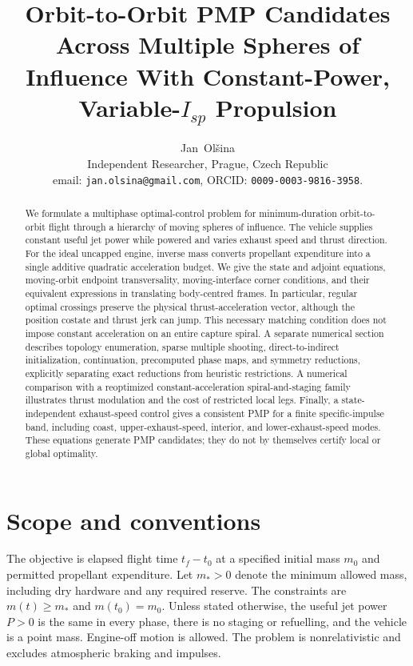 \documentclass[journal, a4paper]{IEEEtran}
\begin{document}
\title{Orbit-to-Orbit PMP Candidates Across Multiple Spheres of Influence With Constant-Power, Variable-$I_{\!sp}$ Propulsion}
\author{Jan~Ol\v{s}ina\\[1ex] Independent Researcher, Prague, Czech Republic\\
email: \texttt{jan.olsina@gmail.com}, ORCID: \texttt{0009-0003-9816-3958}.}
\maketitle
\begin{abstract}
We formulate a multiphase optimal-control problem for minimum-duration orbit-to-orbit flight through a hierarchy of moving spheres of influence. The vehicle supplies constant useful jet power while powered and varies exhaust speed and thrust direction. For the ideal uncapped engine, inverse mass converts propellant expenditure into a single additive quadratic acceleration budget. We give the state and adjoint equations, moving-orbit endpoint transversality, moving-interface corner conditions, and their equivalent expressions in translating body-centred frames. In particular, regular optimal crossings preserve the physical thrust-acceleration vector, although the position costate and thrust jerk can jump. This necessary matching condition does not impose constant acceleration on an entire capture spiral. A separate numerical section describes topology enumeration, sparse multiple shooting, direct-to-indirect initialization, continuation, precomputed phase maps, and symmetry reductions, explicitly separating exact reductions from heuristic restrictions. A numerical comparison with a reoptimized constant-acceleration spiral-and-staging family illustrates thrust modulation and the cost of restricted local legs. Finally, a state-independent exhaust-speed control gives a consistent PMP for a finite specific-impulse band, including coast, upper-exhaust-speed, interior, and lower-exhaust-speed modes. These equations generate PMP candidates; they do not by themselves certify local or global optimality.
\end{abstract}

\section{Scope and conventions}
The objective is elapsed flight time $t_f-t_0$ at a specified initial mass $m_0$ and permitted propellant expenditure. Let $m_*>0$ denote the minimum allowed mass, including dry hardware and any required reserve. The constraints are $m(t)\ge m_*$ and $m(t_0)=m_0$. Unless stated otherwise, the useful jet power $P>0$ is the same in every phase, there is no staging or refuelling, and the vehicle is a point mass. Engine-off motion is allowed. The problem is nonrelativistic and excludes atmospheric braking and impulses.
\end{document}
